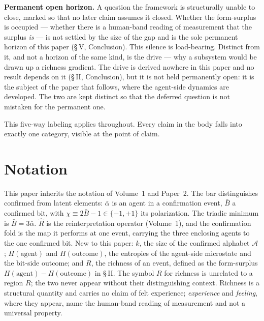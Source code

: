 \documentclass[11pt,oneside]{report}
\theoremstyle{definition}
\theoremstyle{remark}
\begin{document}
\textbf{Permanent open horizon.} A question the framework is structurally unable to
close, marked so that no later claim assumes it closed. Whether the form-surplus is
occupied --- whether there is a human-band reading of measurement that the surplus
\emph{is} --- is not settled by the size of the gap and is the sole permanent horizon
of this paper (\S\,V, Conclusion). This silence is load-bearing. Distinct from it, and
not a horizon of the same kind, is the drive --- why a subsystem would be drawn up a
richness gradient. The drive is derived nowhere in this paper and no result depends on
it (\S\,II, Conclusion), but it is not held permanently open: it is the subject of the
paper that follows, where the agent-side dynamics are developed. The two are kept
distinct so that the deferred question is not mistaken for the permanent one.

This five-way labeling applies throughout. Every claim in the body falls into
exactly one category, visible at the point of claim.

\section*{Notation}

This paper inherits the notation of Volume~1 and Paper~2. The bar distinguishes
confirmed from latent elements: \ensuremath{\bar{\alpha}} is an agent in a
confirmation event, \ensuremath{\bar{B}} a confirmed bit, with
\ensuremath{\chi \equiv 2\bar{B} - 1 \in \{-1, +1\}} its polarization. The triadic
minimum is \ensuremath{\bar{B} = 3\bar{\alpha}}. \ensuremath{\hat{R}} is the
reinterpretation operator (Volume~1), and the confirmation fold is the map it
performs at one event, carrying the three enclosing agents to the one confirmed
bit. New to this paper: \ensuremath{k}, the size of the confirmed alphabet
\ensuremath{\mathcal{A}}; \ensuremath{H(\text{agent})} and
\ensuremath{H(\text{outcome})}, the entropies of the agent-side microstate and the
bit-side outcome; and \ensuremath{R}, the richness of an event, defined as the
form-surplus \ensuremath{H(\text{agent}) - H(\text{outcome})} in \S\,II. The symbol
\ensuremath{R} for richness is unrelated to a region \ensuremath{R}; the two never
appear without their distinguishing context. Richness is a structural quantity and
carries no claim of felt experience; \emph{experience} and \emph{feeling}, where
they appear, name the human-band reading of measurement and not a universal
property.
\end{document}
